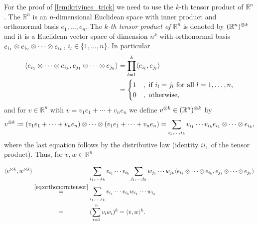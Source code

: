 	\noindent For the proof of \ref{lem:krivines_trick} we need to use the $k$-th tensor product of $\mathbb{R}^n$. The $\mathbb{R}^n$ is an $n$-dimensional Euclidean space with inner product \sclr{\cdot}{\cdot} and orthonormal basis $e_1,\dots,e_n$. The \emph{$k$-th tensor product of $\mathbb{R}^n$} is denoted by $(\mathbb{R}^n)^{\otimes k}$ and it is a Euclidean  vector space of dimension $n^k$ with orthonormal basis $e_{i_1}\otimes e_{i_2} \otimes \cdots \otimes e_{i_k}$, $i_l\in\{1,\dots,n\}$. In particular
	\begin{align}
		\langle{e_{i_1}\ensuremath{\otimes}\cdots \ensuremath{\otimes}e_{i_k}},{e_{j_1}\otimes \cdots \otimes e_{j_k}}\rangle
		&= \prod_{l=1}^k \langle{e_{i_l}},{e_{j_l}}\rangle\nonumber\\
		&=\begin{cases}
			1 & , \text{ if } i_l=j_l \text{ for all } l=1,\dots,n,\\
			0 & , \text{ otherwise},
		\end{cases} \label{eq:orthonormtensor}
	\end{align}
	and for $v\in\mathbb{R}^n$ with $v=v_1e_1+\cdots +v_ne_n$ we define $v^{\otimes k} \in (\mathbb{R}^n)^{\otimes k}$ by 
	\begin{equation}
		v^{\otimes k} \coloneqq (v_1e_1 + \cdots + v_ne_n) \otimes \cdots \otimes (v_1e_1 + \cdots + v_ne_n) = \sum_{i_1,\dots,i_k} v_{i_1}\cdots v_{i_k} e_{i_1}\otimes\cdots\otimes e_{i_k},
	\end{equation}
	where the last equation follows by the distributive law (identity $ii,$ of the tensor product). 
	Thus, for $v,w\in\mathbb{R}^n$ 
	\begin{align}
		\sclr{v^{\tensor k}}{w^{\tensor k}}
		&\overset{\textcolor{white}{\eqref*{eq:orthonormtensor}}}{=} \sum_{i_1,\dots,i_k} v_{i_1}\cdots v_{i_k} \sum_{j_1,\dots,j_k} w_{j_1}\cdots w_{j_k} \sclr{e_{i_1}\tensor\cdots\tensor e_{i_k}}{e_{j_1}\tensor\cdots\tensor e_{j_k}} \nonumber\\
		&\overset{\eqref{eq:orthonormtensor}}{=} \sum_{i_1,\dots,i_k} v_{i_1}\cdots v_{i_k}w_{i_1}\cdots w_{i_k} \nonumber\\
		&\overset{\textcolor{white}{\eqref*{eq:orthonormtensor}}}{=}(\sum_{i=1}^n v_iw_i)^k = \sclr{v}{w}^k. \label{eq:kth_tensor}
	\end{align}

